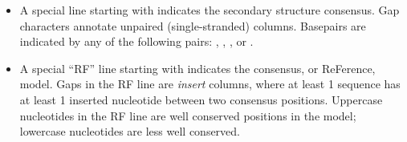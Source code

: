 \begin{itemize}
\item A special line starting with 
  indicates the secondary structure consensus. Gap characters annotate
  unpaired (single-stranded) columns. Basepairs are indicated by any
  of the following pairs: \prog{<>}, \prog{()}, \prog{[]}, or
  \prog{[]}.

\item A special ``RF'' line starting with {}
  indicates the consensus, or ReFerence, model. Gaps in the RF line
  are \emph{insert} columns, where at least 1 sequence has at least 1
  inserted nucleotide between two consensus positions. Uppercase nucleotides
  in the RF line are well conserved positions in the model; lowercase
  nucleotides are less well conserved.
\end{itemize}

